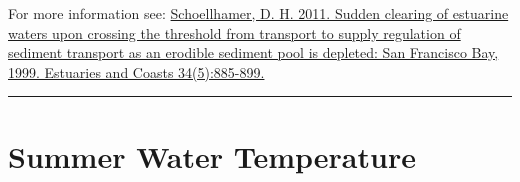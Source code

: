 \documentclass[
]{book}
\begin{document}
\begin{disclaimer}
For more information see:
\href{https://link.springer.com/article/10.1007/s12237-011-9382-x}{Schoellhamer,
D. H. 2011. Sudden clearing of estuarine waters upon crossing the
threshold from transport to supply regulation of sediment transport as
an erodible sediment pool is depleted: San Francisco Bay, 1999.
Estuaries and Coasts 34(5):885-899.}
\end{disclaimer}

\begin{center}\rule{0.5\linewidth}{0.5pt}\end{center}

\hypertarget{summer-water-temperature}{%
\section{Summer Water Temperature}\label{summer-water-temperature}}
\end{document}
